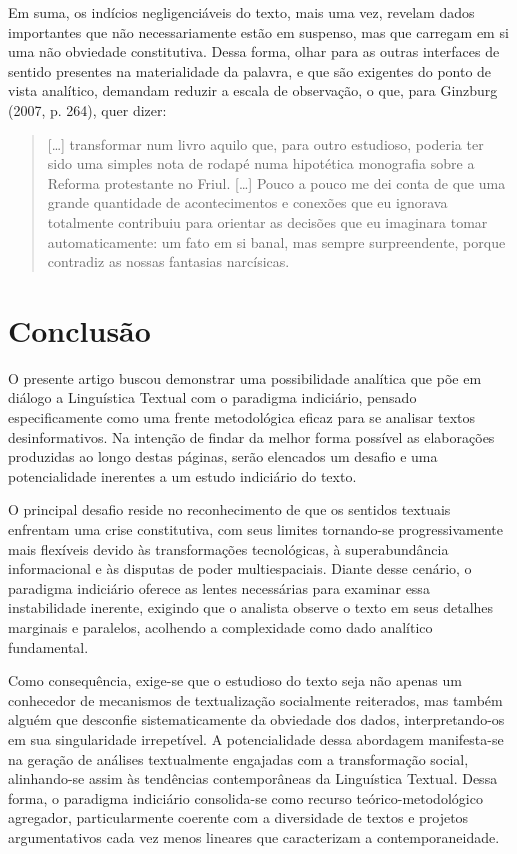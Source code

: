 \documentclass[portuguese]{textolivre}
\begin{document}
Em suma, os indícios negligenciáveis do texto, mais uma vez, revelam dados importantes que não necessariamente estão em suspenso, mas que carregam em si uma não obviedade constitutiva. Dessa forma, olhar para as outras interfaces de sentido presentes na materialidade da palavra, e que são exigentes do ponto de vista analítico, demandam reduzir a escala de observação, o que, para Ginzburg (2007, p. 264), quer dizer:

\begin{quote}
    […] transformar num livro aquilo que, para outro estudioso, poderia ter sido uma simples nota de rodapé numa hipotética monografia sobre a Reforma protestante no Friul. […] Pouco a pouco me dei conta de que uma grande quantidade de acontecimentos e conexões que eu ignorava totalmente contribuiu para orientar as decisões que eu imaginara tomar automaticamente: um fato em si banal, mas sempre surpreendente, porque contradiz as nossas fantasias narcísicas.
\end{quote}


\section{Conclusão}\label{sec-fmt-manuscrito}
O presente artigo buscou demonstrar uma possibilidade analítica que põe em diálogo a Linguística Textual com o paradigma indiciário, pensado especificamente como uma frente metodológica eficaz para se analisar textos desinformativos. Na intenção de findar da melhor forma possível as elaborações produzidas ao longo destas páginas, serão elencados um desafio e uma potencialidade inerentes a um estudo indiciário do texto.

O principal desafio reside no reconhecimento de que os sentidos textuais enfrentam uma crise constitutiva, com seus limites tornando-se progressivamente mais flexíveis devido às transformações tecnológicas, à superabundância informacional e às disputas de poder multiespaciais. Diante desse cenário, o paradigma indiciário oferece as lentes necessárias para examinar essa instabilidade inerente, exigindo que o analista observe o texto em seus detalhes marginais e paralelos, acolhendo a complexidade como dado analítico fundamental.

Como consequência, exige-se que o estudioso do texto seja não apenas um conhecedor de mecanismos de textualização socialmente reiterados, mas também alguém que desconfie sistematicamente da obviedade dos dados, interpretando-os em sua singularidade irrepetível. A potencialidade dessa abordagem manifesta-se na geração de análises textualmente engajadas com a transformação social, alinhando-se assim às tendências contemporâneas da Linguística Textual. Dessa forma, o paradigma indiciário consolida-se como recurso teórico-metodológico agregador, particularmente coerente com a diversidade de textos e projetos argumentativos cada vez menos lineares que caracterizam a contemporaneidade.
\end{document}
